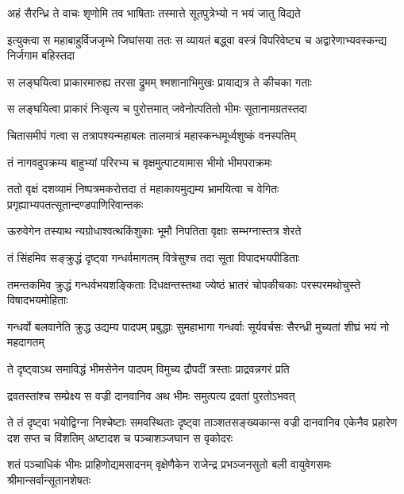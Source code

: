 


\twolineshloka
{अहं सैरन्ध्रि ते वाचः शृणोमि तव भाषिताः}
{तस्मात्ते सूतपुत्रेभ्यो न भयं जातु विद्यते}



\onelineshloka
{इत्युक्त्वा स महाबाहुर्विजजृम्भे जिघांसया}
\twolineshloka
{ततः स व्यायतं बद्ध्वा वस्त्रं विपरिवेष्ट्य च}
{अद्वारेणाभ्यवस्कन्द्य निर्जगाम बहिस्तदा}


\twolineshloka
{स लङ्घयित्वा प्राकारमारुह्य तरसा द्रुमम्}
{श्मशानाभिमुखः प्रायाद्यत्र ते कीचका गताः}


\twolineshloka
{स लङ्घयित्वा प्राकारं निःसृत्य च पुरोत्तमात्}
{जवेनोत्पतितो भीमः सूतानामग्रतस्तदा}


\twolineshloka
{चितासमीपं गत्वा स तत्रापश्यन्महाबलः}
{तालमात्रं महास्कन्धमूर्ध्वशुष्कं वनस्पतिम्}


\twolineshloka
{तं नागवदुपक्रम्य बाहुभ्यां परिरभ्य च}
{वृक्षमुत्पाटयामास भीमो भीमपराक्रमः}


\onelineshloka
{ततो वृक्षं दशव्यामं निष्पत्रमकरोत्तदा}
\twolineshloka
{तं महाकायमुद्यम्य भ्रामयित्वा च वेगितः}
{प्रगृह्याभ्यपतत्सूतान्दण्डपाणिरिवान्तकः}


\twolineshloka
{ऊरुवेगेन तस्याथ न्यग्रोधाश्वत्थकिंशुकाः}
{भूमौ निपतिता वृक्षाः सम्भग्नास्तत्र शेरते}


\twolineshloka
{तं सिंहमिव सङ्क्रुद्धं दृष्ट्वा गन्धर्वमागतम्}
{वित्रेसुश्च तदा सूता विपादभयपीडिताः}


\threelineshloka
{तमन्तकमिव क्रुद्धं गन्धर्वभयशङ्किताः}
{दिधक्षन्तस्तथा ज्येष्ठं भ्रातरं चोपकीचकाः}
{परस्परमथोचुस्ते विषादभयमोहिताः}


\threelineshloka
{गन्धर्वो बलवानेति क्रुद्ध उद्यम्य पादपम्}
{प्रबुद्धाः सुमहाभागा गन्धर्वाः सूर्यवर्चसः}
{सैरन्ध्री मुच्यतां शीघ्रं भयं नो महदागतम्}



\twolineshloka
{ते दृष्ट्वाऽथ समाविद्धं भीमसेनेन पादपम्}
{विमुच्य द्रौपदीं त्रस्ताः प्राद्रवन्नगरं प्रति}


\twolineshloka
{द्रवतस्तांश्च सम्प्रेक्ष्य स वज्री दानवानिव}
{अथ भीमः समुत्पत्य द्रवतां पुरतोऽभवत्}


\onelineshloka
{ते तं दृष्ट्वा भयोद्विग्ना निश्चेष्टाः समवस्थिताः}
\threelineshloka
{दृष्ट्वा ताञ्शतसङ्ख्यकान्स वज्री दानवानिव}
{एकेनैव प्रहारेण दश सप्त च विंशतिम्}
{अष्टादश च पञ्चाशञ्जघान स वृकोदरः}


\threelineshloka
{शतं पञ्चाधिकं भीमः प्राहिणोद्यमसादनम्}
{वृक्षेणैकेन राजेन्द्र प्रभञ्जनसुतो बली}
{वायुवेगसमः श्रीमान्सर्वान्सूतानशेषतः}


